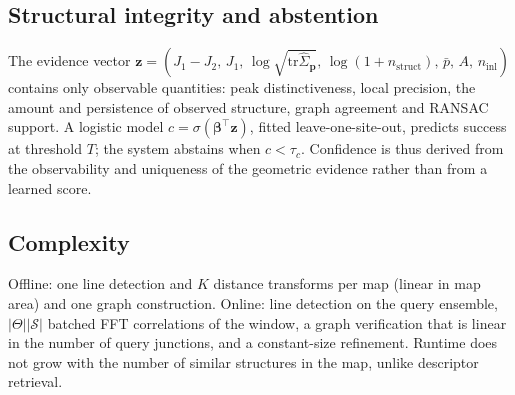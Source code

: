 \subsection{Structural integrity and abstention}
\label{sec:integrity}
The evidence vector
$\mathbf z=(J_1-J_2,\,J_1,\,\log\sqrt{\mathrm{tr}\hat\Sigma_{\mathbf p}},\,
\log(1+n_{\mathrm{struct}}),\,\bar p,\,A,\,n_{\mathrm{inl}})$ contains only
observable quantities: peak distinctiveness, local precision, the amount and
persistence of observed structure, graph agreement and RANSAC support. A
logistic model $c=\sigma(\boldsymbol\beta^\top\mathbf z)$, fitted
leave-one-site-out, predicts success at threshold $T$; the system abstains
when $c<\tau_c$. Confidence is thus derived from the observability and
uniqueness of the geometric evidence rather than from a learned score.

\subsection{Complexity}
\label{sec:complexity}
Offline: one line detection and $K$ distance transforms per map (linear in map
area) and one graph construction. Online: line detection on the query
ensemble, $|\Theta||\mathcal S|$ batched FFT correlations of the window, a
graph verification that is linear in the number of query junctions, and a
constant-size refinement. Runtime does not grow with the number of similar
structures in the map, unlike descriptor retrieval.


